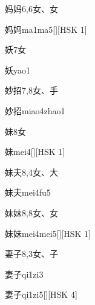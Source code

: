 \begin{entry}{妈妈}{6,6}{⼥、⼥}
  \begin{phonetics}{妈妈}{ma1ma5}[][HSK 1]
  \end{phonetics}
\end{entry}

\begin{entry}{妖}{7}{⼥}
  \begin{phonetics}{妖}{yao1}
  \end{phonetics}
\end{entry}

\begin{entry}{妙招}{7,8}{⼥、⼿}
  \begin{phonetics}{妙招}{miao4zhao1}
  \end{phonetics}
\end{entry}

\begin{entry}{妹}{8}{⼥}
  \begin{phonetics}{妹}{mei4}[][HSK 1]
  \end{phonetics}
\end{entry}

\begin{entry}{妹夫}{8,4}{⼥、⼤}
  \begin{phonetics}{妹夫}{mei4fu5}
  \end{phonetics}
\end{entry}

\begin{entry}{妹妹}{8,8}{⼥、⼥}
  \begin{phonetics}{妹妹}{mei4mei5}[][HSK 1]
  \end{phonetics}
\end{entry}

\begin{entry}{妻子}{8,3}{⼥、⼦}
  \begin{phonetics}{妻子}{qi1zi3}
  \end{phonetics}
  \begin{phonetics}{妻子}{qi1zi5}[][HSK 4]
  \end{phonetics}
\end{entry}


